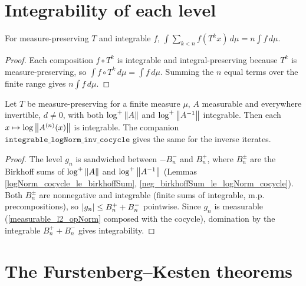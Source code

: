 \section{Integrability of each level}

\begin{lemma}\label{integral_birkhoffSum}
  \leanok
  For measure-preserving \(T\) and integrable \(f\),
  \(\int \sum_{k<n} f(T^{k}x)\,d\mu = n\int f\,d\mu\).
\end{lemma}
\begin{proof}\leanok
  Each composition \(f\circ T^{k}\) is integrable and integral-preserving because
  \(T^{k}\) is measure-preserving, so \(\int f\circ T^{k}\,d\mu = \int f\,d\mu\). Summing
  the \(n\) equal terms over the finite range gives \(n\int f\,d\mu\).
\end{proof}

\begin{theorem}\label{integrable_logNorm_cocycle}
  \leanok
  Let \(T\) be measure-preserving for a finite measure \(\mu\), \(A\) measurable and
  everywhere invertible, \(d \neq 0\), with both \(\log^{+}\left\lVert A \right\rVert\) and
  \(\log^{+}\left\lVert A^{-1} \right\rVert\) integrable. Then each \(x \mapsto \log\left\lVert A^{(n)}(x) \right\rVert\) is
  integrable. The companion \(\texttt{integrable\_logNorm\_inv\_cocycle}\) gives the same
  for the inverse iterates.
\end{theorem}
\begin{proof}\leanok
  The level \(g_n\) is sandwiched between \(-B_n^{-}\) and \(B_n^{+}\), where
  \(B_n^{\pm}\) are the Birkhoff sums of \(\log^{+}\left\lVert A \right\rVert\) and \(\log^{+}\left\lVert A^{-1} \right\rVert\)
  (Lemmas \ref{logNorm_cocycle_le_birkhoffSum}, \ref{neg_birkhoffSum_le_logNorm_cocycle}).
  Both \(B_n^{\pm}\) are nonnegative and integrable (finite sums of integrable, m.p.
  precompositions), so \(\left\lvert g_n \right\rvert \le B_n^{+} + B_n^{-}\) pointwise. Since \(g_n\) is
  measurable (\ref{measurable_l2_opNorm} composed with the cocycle), domination by the
  integrable \(B_n^{+}+B_n^{-}\) gives integrability.
\end{proof}

\section{The Furstenberg--Kesten theorems}

